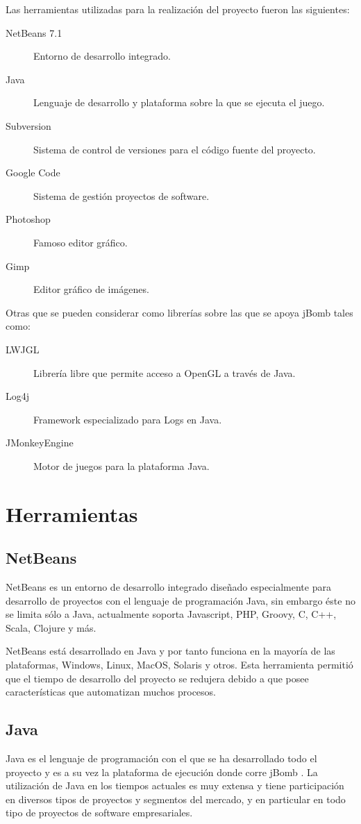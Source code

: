 \documentclass[a4paper,12pt,openany,oneside]{book}
\begin{document}
Las herramientas utilizadas para la realización del proyecto fueron las siguientes:
\begin{description}
\item[NetBeans 7.1] Entorno de desarrollo integrado.
\item[Java] Lenguaje de desarrollo y plataforma sobre la que se ejecuta el juego.
\item[Subversion] Sistema de control de versiones para el código fuente del proyecto.
\item[Google Code] Sistema de gestión proyectos de software.
\item[Photoshop] Famoso editor gráfico.
\item[Gimp] Editor gráfico de imágenes.
\end{description}
Otras que se pueden considerar como librerías sobre las que se apoya jBomb tales como:
\begin{description}
\item[LWJGL] Librería libre que permite acceso a OpenGL a través de Java.
\item[Log4j] Framework especializado para Logs en Java.
\item[JMonkeyEngine] Motor de juegos para la plataforma Java.
\end{description}
\section{Herramientas}
\subsection{NetBeans}
NetBeans es un entorno de desarrollo integrado diseñado especialmente para desarrollo de proyectos con el lenguaje de programación Java, sin embargo éste no se limita sólo a Java, actualmente soporta Javascript, PHP, Groovy, C, C++, Scala, Clojure y más.

NetBeans está desarrollado en Java y por tanto funciona en la mayoría de las plataformas, Windows, Linux, MacOS, Solaris y otros.
Esta herramienta permitió que el tiempo de desarrollo del proyecto se redujera debido a que posee características que automatizan muchos procesos.
\subsection{Java}
Java es el lenguaje de programación con el que se ha desarrollado todo el proyecto y es a su vez la plataforma de ejecución donde corre jBomb \cite{JAVA}. La utilización de Java en los tiempos actuales es muy extensa y tiene participación en diversos tipos de proyectos y segmentos del mercado, y en particular en todo tipo de proyectos de software empresariales.
\end{document}

